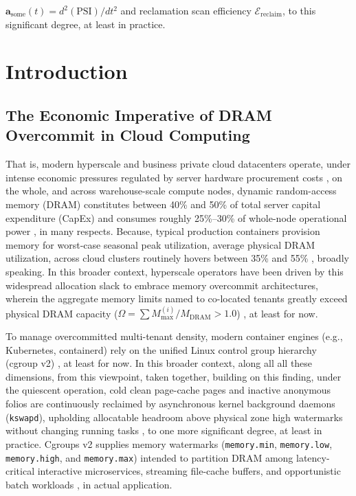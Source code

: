 \documentclass[pdflatex,sn-mathphys,Numbered]{sn-jnl}
\begin{document}
{$\mathbf{a}_{\text{some}}(t) = d^2(\text{PSI})/dt^2$ and reclamation scan efficiency $\mathcal{E}_{\text{reclaim}}$, to this significant degree, at least in practice.
}


\maketitle

\section{Introduction}
\label{sec:intro}

\subsection{The Economic Imperative of DRAM Overcommit in Cloud Computing}
That is, modern hyperscale and business private cloud datacenters operate, under intense economic pressures regulated by server hardware procurement costs \cite{barham2003xen, waldspurger2002esx}, on the whole, and across warehouse-scale compute nodes, dynamic random-access memory (DRAM) constitutes between 40\% and 50\% of total server capital expenditure (CapEx) and consumes roughly 25\%--30\% of whole-node operational power \cite{verma2015borg, tirmazi2020borg}, in many respects. Because, typical production containers provision memory for worst-case seasonal peak utilization, average physical DRAM utilization, across cloud clusters routinely hovers between 35\% and 55\% \cite{cortez2017resourcecentral, rzadca2020autopilot}, broadly speaking. In this broader context, hyperscale operators have been driven by this widespread allocation slack to embrace memory overcommit architectures, wherein the aggregate memory limits named to co-located tenants greatly exceed physical DRAM capacity ($\Omega = \sum M_{\max}^{(i)} / M_{\text{DRAM}} > 1.0$) \cite{lagarcavilla2019far, li2023pond}, at least for now.

To manage overcommitted multi-tenant density, modern container engines (e.g., Kubernetes, containerd) rely on the unified Linux control group hierarchy (cgroup v2) \cite{weiner2022tmo}, at least for now. In this broader context, along all all these dimensions, from this viewpoint, taken together, building on this finding, under the quiescent operation, cold clean page-cache pages and inactive anonymous folios are continuously reclaimed by asynchronous kernel background daemons (\texttt{kswapd}), upholding allocatable headroom above physical zone high watermarks without changing running tasks \cite{liu2021hpc}, to one more significant degree, at least in practice. Cgroups v2 supplies memory watermarks (\texttt{memory.min}, \texttt{memory.low}, \texttt{memory.high}, and \texttt{memory.max}) intended to partition DRAM among latency-critical interactive microservices, streaming file-cache buffers, and opportunistic batch workloads \cite{amaro2020far, ruan2020aifm}, in actual application.
\end{document}
